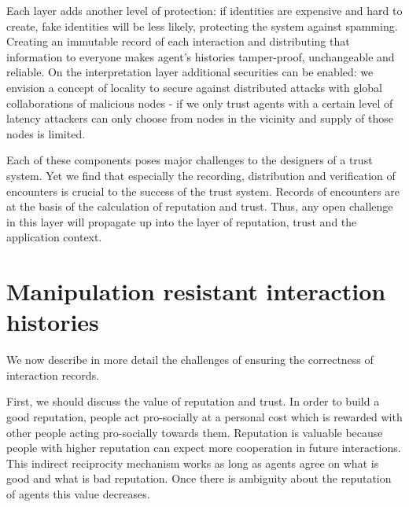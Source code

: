 
Each layer adds another level of protection: if identities are expensive and hard to create, fake 
identities will be less likely, protecting the system against spamming. Creating an immutable
record of each interaction and distributing that information to everyone makes agent's histories tamper-proof, unchangeable and reliable.
On the interpretation layer additional securities can be 
enabled: we envision a concept of locality to secure against distributed attacks with global 
collaborations of malicious nodes - if we only trust agents with a certain level of latency 
attackers can only choose from nodes in the vicinity and supply of those nodes is limited. 

Each of these components poses major challenges to the designers of a trust system. Yet we find 
that especially the recording, distribution and verification of encounters is crucial to the 
success of the trust system. Records of encounters are at the basis of the calculation of
reputation and trust. Thus, any open challenge in this layer will propagate up into the layer
of reputation, trust and the application context.

\section{Manipulation resistant interaction histories}
We now describe in more detail the challenges of ensuring the correctness of interaction records.

First, we should discuss the value of reputation and trust. In order to build a good reputation,
people act pro-socially at a personal cost which is rewarded with other people acting pro-socially 
towards them. Reputation is valuable because people with higher 
reputation can expect more cooperation in future interactions. This indirect reciprocity mechanism 
works as long as agents agree on what is good and what is bad reputation. Once there is ambiguity 
about the reputation of agents this value decreases. 

